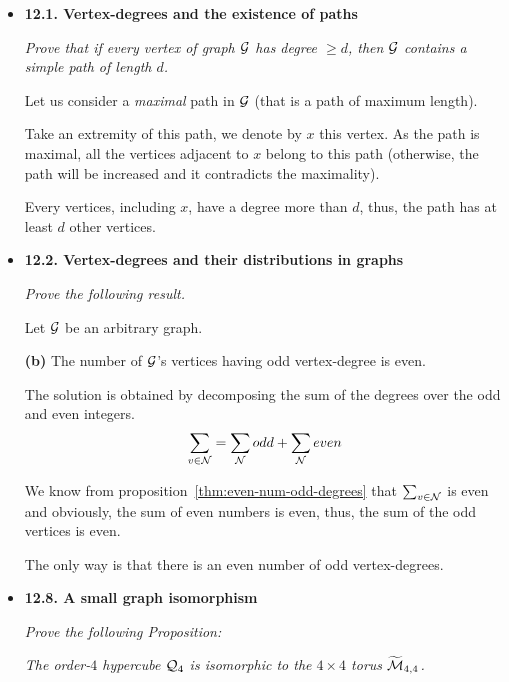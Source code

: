 


\begin{itemize}
\item
{\bf 12.1. Vertex-degrees and the existence of paths}
\smallskip

{\em Prove that if every vertex of graph $\mbox{$\cal G$}$ has degree $\geq d$, then $\mbox{$\cal G$}$ contains a {\em simple} path of length $d$.}
\smallskip

Let us consider a \textit{maximal} path in $\mbox{$\cal G$}$ (that is a path of maximum length). 

Take an extremity of this path, we denote by $x$ this vertex.
As the path is maximal, all the vertices adjacent to $x$ belong to this path (otherwise, the path will be increased
and it contradicts the maximality).

Every vertices, including $x$, have a degree more than $d$, thus, the path has at least $d$ other vertices.

\medskip\item
{\bf 12.2. Vertex-degrees and their distributions in graphs}
\smallskip

{\em Prove the following result.}

Let $\mbox{$\cal G$}$ be an arbitrary graph.
\smallskip

{\bf (b)}
The number of $\mbox{$\cal G$}$'s vertices having odd vertex-degree is even.

The solution is obtained by decomposing the sum of the degrees over the odd and even integers.
\[
\sum_{v \in {\cal N}}  =  \sum_{\cal N} odd + \sum_{\cal N} even
\]
\smallskip

We know from proposition~\ref{thm:even-num-odd-degrees} that 
$\sum_{v \in {\cal N}}$ is even and obviously, the sum of even numbers is even,
thus,  the sum of the odd vertices is even.

The only way is that there is an even number of odd vertex-degrees. 

\medskip\item
{\bf 12.8. A small graph isomorphism}
\smallskip

{\em Prove the following Proposition:}
\smallskip

{\em The order-$4$ hypercube $\mbox{$\cal Q$}_4$ is \textit{isomorphic} to the $4 \times 4$ torus $\widetilde{\mbox{$\cal M$}}_{4,4}$.}
\smallskip


\end{itemize}
